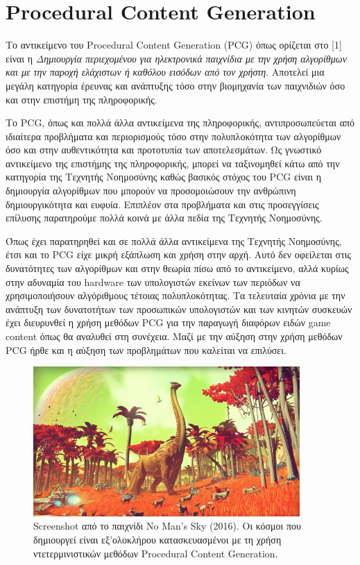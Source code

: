 \thispagestyle{empty}

\chapter{Procedural Content Generation}

Το αντικείμενο του Procedural Content Generation (PCG) όπως ορίζεται στο [1] είναι η \textit{Δημιουργία περιεχομένου για ηλεκτρονικά παιχνίδια με την χρήση αλγορίθμων και με την παροχή ελάχιστων ή καθόλου εισόδων από τον χρήστη}. Αποτελεί μια μεγάλη κατηγορία έρευνας και ανάπτυξης τόσο στην βιομηχανία των  παιχνιδιών όσο και στην επιστήμη της πληροφορικής.
\par
Το PCG, όπως και πολλά άλλα αντικείμενα της πληροφορικής, αντιπροσωπεύεται από ιδιαίτερα προβλήματα και περιορισμούς τόσο στην πολυπλοκότητα των αλγορίθμων όσο και στην αυθεντικότητα και προτοτυπία των αποτελεσμάτων.  Ως γνωστικό αντικείμενο της επιστήμης της πληροφορικής, μπορεί να ταξινομηθεί κάτω από την κατηγορία της Τεχνητής Νοημοσύνης καθώς βασικός στόχος του PCG είναι η δημιουργία αλγορίθμων που μπορούν να προσομοιώσουν την ανθρώπινη δημιουργικότητα και ευφυία. Επιπλέον στα προβλήματα και στις προσεγγίσεις επίλυσης παρατηρούμε πολλά κοινά με άλλα πεδία της Τεχνητής Νοημοσύνης.
\par
Όπως έχει παρατηρηθεί και σε πολλά άλλα αντικείμενα της Τεχνητής Νοημοσύνης, έτσι και το PCG είχε μικρή εξάπλωση και χρήση στην αρχή. Αυτό δεν οφείλεται στις δυνατότητες των αλγορίθμων και στην θεωρία πίσω από το αντικείμενο, αλλά κυρίως στην αδυναμία του hardware των υπολογιστών εκείνων των περιόδων να χρησιμοποιήσουν αλγόριθμους τέτοιας πολυπλοκότητας. Τα τελευταία χρόνια με την ανάπτυξη των δυνατοτήτων των προσωπικών υπολογιστών και των κινητών συσκευών έχει διευρυνθεί η χρήση μεθόδων PCG για την παραγωγή διαφόρων ειδών game content όπως θα αναλυθεί στη συνέχεια. Μαζί με την αύξηση στην χρήση μεθόδων PCG ήρθε και η αύξηση των προβλημάτων που καλείται να επιλύσει.

\begin{figure}[ht]
\centering
\includegraphics[width=4in]{../images/no-mans-sky.jpg}
\caption{Screenshot από το παιχνίδι No Man's Sky (2016). Οι κόσμοι που δημιουργεί είναι εξ'ολοκλήρου κατασκευασμένοι με τη χρήση ντετερμινιστικών μεθόδων Procedural Content Generation.}
\end{figure}

